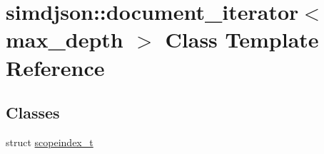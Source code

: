 \hypertarget{classsimdjson_1_1document__iterator}{}\section{simdjson\+:\+:document\+\_\+iterator$<$ max\+\_\+depth $>$ Class Template Reference}
\label{classsimdjson_1_1document__iterator}
\subsection*{Classes}
\begin{DoxyCompactItemize}
\item 
struct \hyperlink{structsimdjson_1_1document__iterator_1_1scopeindex__t}{scopeindex\+\_\+t}
\end{DoxyCompactItemize}
